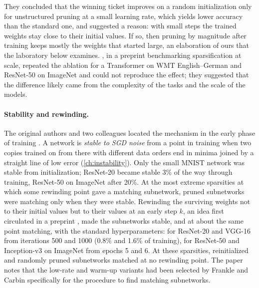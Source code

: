 \begin{refsection}
They concluded that the winning ticket improves on a random initialization only for unstructured pruning at a small learning rate, which yields lower accuracy than the standard one, and suggested a reason: with small steps the trained weights stay close to their initial values. If so, then pruning by magnitude after training keeps mostly the weights that started large, an elaboration of ours that the laboratory below examines. \Textcite{GaleElsenHooker2019}, in a preprint benchmarking sparsification at scale, repeated the ablation for a Transformer on WMT English--German and ResNet-50 on ImageNet and could not reproduce the effect; they suggested that the difference likely came from the complexity of the tasks and the scale of the models.

\paragraph{Stability and rewinding.} The original authors and two colleagues located the mechanism in the early phase of training \parencite{FrankleEtAl2020}. A network is \emph{stable to SGD noise} from a point in training when two copies trained on from there with different data orders end in minima joined by a straight line of low error (\cref{ch:instability}). Only the small MNIST network was stable from initialization; ResNet-20 became stable 3\% of the way through training, ResNet-50 on ImageNet after 20\%. At the most extreme sparsities at which some rewinding point gave a matching subnetwork, pruned subnetworks were matching only when they were stable. Rewinding the surviving weights not to their initial values but to their values at an early step $k$, an idea first circulated in a preprint \parencite{FrankleEtAl2019}, made the subnetworks stable, and at about the same point matching, with the standard hyperparameters: for ResNet-20 and VGG-16 from iterations 500 and 1000 (0.8\% and 1.6\% of training), for ResNet-50 and Inception-v3 on ImageNet from epochs 5 and 6. At these sparsities, reinitialized and randomly pruned subnetworks matched at no rewinding point. The paper notes that the low-rate and warm-up variants had been selected by Frankle and Carbin specifically for the procedure to find matching subnetworks.


\end{refsection}

